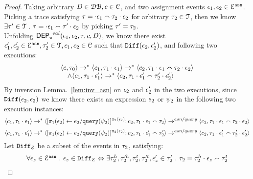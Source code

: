 \begin{proof}
Taking arbitrary $D \in \mathcal{DB} , c \in \mathcal{C}$, and two assignment events $\mathtt{\epsilon}_1, \mathtt{\epsilon}_2\in \mathcal{E}^{\mathtt{{asn}}}$.
\\
Picking a trace satisfying $\mathtt{\tau} = \cdot \mathtt{\epsilon}_1 \smallfrown \mathtt{\tau}_2 \cdot \mathtt{\epsilon}_2$ for arbitrary $\mathtt{\tau}_2 \in \mathcal{T}$,
 then we know 
\\
$\exists \mathtt{\tau}' \in \mathcal{T} ~.~ \mathtt{\tau} = \cdot \mathtt{\epsilon}_1 \smallfrown \mathtt{\tau}' \cdot \mathtt{\epsilon}_2$ by picking $\mathtt{\tau}' = \mathtt{\tau}_2$.
\\
Unfolding $\mathsf{DEP_{\mathtt{e}}}^{val}(\mathtt{\epsilon}_1, \mathtt{\epsilon}_2, \mathtt{\tau}, c, D)$, we know there exist $ \mathtt{\epsilon}_1', \mathtt{\epsilon}_2' \in \mathcal{E}^{\mathtt{{asn}}},
\mathtt{\tau}_2' \in \mathcal{T}, c_1, c_2 \in \mathcal{C}$ such that 
$\mathtt{Diff}(\mathtt{\epsilon}_2, \mathtt{\epsilon}_2')$,
 and following two executions:
%
\[
\begin{array}{l}
\langle c, \mathtt{\tau}_0 \rangle \rightarrow^{*}
\langle c_1, \mathtt{\tau}_1 \cdot \mathtt{\epsilon}_1 \rangle \rightarrow^{*} \langle c_2, \mathtt{\tau}_1 \cdot \mathtt{\epsilon}_1 \smallfrown \mathtt{\tau}_2 \cdot \mathtt{\epsilon}_2 \rangle 
\\ \quad
\land
\langle c_1, \mathtt{\tau}_1 \cdot \mathtt{\epsilon}_1' \rangle \rightarrow^{*} \langle c_2, \mathtt{\tau}_1 \cdot \mathtt{\epsilon}_1' \smallfrown \mathtt{\tau}_2' \cdot \mathtt{\epsilon}_2' \rangle 
\end{array}
\]
%
%
By inversion Lemma.~\ref{lem:inv_asn} on $\mathtt{\epsilon}_2$ and $\mathtt{\epsilon}_2'$ in the two executions, 
since $\mathtt{Diff}(\mathtt{\epsilon}_2, \mathtt{\epsilon}_2)$ we know there exists an expression $e_2$ or $\psi_2$ in the following two execution instances:
\[
\langle c_1, \mathtt{\tau}_1 \cdot \mathtt{\epsilon}_1 \rangle \rightarrow^{*} \langle [\mathrel{ \pi_1(\mathtt{\epsilon}_2) \leftarrow e_2 / {\tt query}(\psi_2) }]{}^{\pi_2(\mathtt{\epsilon}_2)};c_2, \mathtt{\tau}_1 \cdot \mathtt{\epsilon}_1 \smallfrown \mathtt{\tau}_2 \rangle 
\rightarrow^{asn / query} \langle c_2, \mathtt{\tau}_1 \cdot \mathtt{\epsilon}_1 \smallfrown \mathtt{\tau}_2 \cdot \mathtt{\epsilon}_2 \rangle  
\]
%
\[
\langle c_1, \mathtt{\tau}_1 \cdot \mathtt{\epsilon}_1' \rangle \rightarrow^{*} \langle [\mathrel{ \pi_1(\mathtt{\epsilon}_2) \leftarrow e_2 / {\tt query}(\psi_2) }]{}^{\pi_2(\mathtt{\epsilon}_2)};c_2, \mathtt{\tau}_1 \cdot \mathtt{\epsilon}_1' \smallfrown \mathtt{\tau}_2' \rangle 
\rightarrow^{asn / query} \langle c_2, \mathtt{\tau}_1 \cdot \mathtt{\epsilon}_1' \smallfrown \mathtt{\tau}_2' \cdot \mathtt{\epsilon}_2' \rangle  
\]
%
Let $\mathtt{Diff}_{\mathcal{E}}$ be a subset of the events in $\mathtt{\tau}_2$, satisfying: 
\[
	\begin{array}{l}
		\forall \mathtt{\epsilon}_z \in \mathcal{E}^{\mathtt{{asn}}} ~.~ 
	\mathtt{\epsilon}_z \in \mathtt{Diff}_{\mathcal{E}} \Leftrightarrow 
	\exists \mathtt{\tau}_2^h, \mathtt{\tau}'^h_2, \mathtt{\tau}_2^t, \mathtt{\tau}'^t_2, \mathtt{\epsilon}_z' \in \mathtt{\tau}_2' ~.~ 
	\mathtt{\tau}_2 = \mathtt{\tau}_2^h \cdot \mathtt{\epsilon}_z \smallfrown \mathtt{\tau}_2^t

\end{array}\]
\end{proof}
